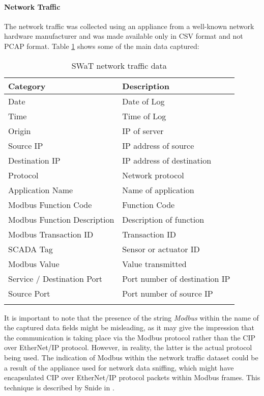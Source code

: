 \paragraph{Network Traffic}
\label{par:5_2015_net_dataset}
The network traffic was collected using an appliance from a well-known network hardware manufacturer and was made available only in CSV format and not PCAP format. Table \ref{table:5_swat_network_traffic_data} shows some of the main data captured:

\vfill
\pagebreak

{\small
\begin{longtable}[c]{p{} p{}}
	\hline
	\textbf{Category} & \textbf{Description} \\ [0.5ex] 
	\hline
	Date & Date of Log \\
	\hline 
	Time & Time of Log \\
	\hline
	Origin & IP of server \\
	\hline 
	Source IP & IP address of source \\ 
	\hline
	Destination IP & IP address of destination \\ 
	\hline
	Protocol & Network protocol \\ 
	\hline
	Application Name & Name of application \\ 
	\hline
	Modbus Function Code & Function Code \\ 
	\hline
	Modbus Function Description & Description of function \\ 
	\hline
	Modbus Transaction ID & Transaction ID \\ 
	\hline
	SCADA Tag & Sensor or actuator ID \\ 
	\hline
	Modbus Value & Value transmitted \\ 
	\hline
	Service / Destination Port & Port number of destination IP \\ 
	\hline
	Source Port & Port number of source IP \\ 
	\hline
	
	\caption{SWaT network traffic data}
	\label{table:5_swat_network_traffic_data}
\end{longtable} }

It is important to note that the presence of the string \textit{Modbus} within the name of the captured data fields might be misleading, as it may give the impression that the communication is taking place via the Modbus protocol rather than the CIP over EtherNet/IP protocol. However, in reality, the latter is the actual protocol being used. The indication of Modbus within the network traffic dataset could be a result of the appliance used for network data sniffing, which might have encapsulated CIP over EtherNet/IP protocol packets within Modbus frames. This technique is described by Snide in \cite{cip_in_modbus}.

